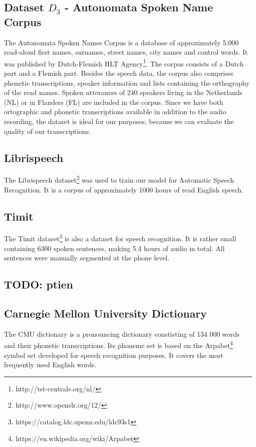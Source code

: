 \subsection{Dataset \textbf{$D_3$} - Autonomata Spoken Name Corpus}
The Autonomata Spoken Names Corpus \cite{van2008autonomata} is a database of approximately 5.000 read-aloud first names, surnames, street names, city names and control words.
It was  published by Dutch-Flemish HLT Agency\footnote{http://tst-centrale.org/nl/}.
The corpus consists of a Dutch part and a Flemish part.
Besides the speech data, the corpus also comprises phonetic transcriptions, speaker information and lists containing the orthography of the read names.
Spoken utterances of 240 speakers living in the Netherlands (NL) or in Flanders (FL) are included in the corpus.
Since we have both ortographic and phonetic transcriptions available in addition to the audio recording, the dataset is ideal for our purposes, because we can evaluate the quality of our transcriptions.
\subsection{Librispeech}
The Librispeech dataset\footnote{http://www.openslr.org/12/} was used to train our model for Automatic Speech Recognition.
It is a corpus of approximately 1000 hours of read English speech.
\subsection{Timit}
The Timit dataset\footnote{https://catalog.ldc.upenn.edu/ldc93s1} is also a dataset for speech recognition. It is rather small containing 6300 spoken sentences, making 5.4 hours of audio in total.
All sentences were manually segmented at the phone level. 
\subsection{TODO: ptien}
\subsection{Carnegie Mellon University Dictionary}
The CMU dictionary is a pronouncing dictionary constisting of 134 000 words and their phonetic transcriptions.
Its phoneme set is based on the Arpabet\footnote{https://en.wikipedia.org/wiki/Arpabet} symbol set developed for speech recognition purposes.
It covers the most frequently used English words.

